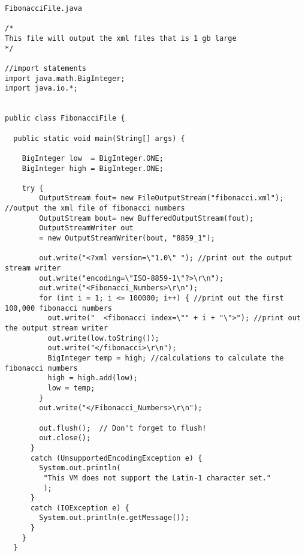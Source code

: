 \documentclass[11pt,english]{article}
\begin{document}
\begin{lstlisting}
FibonacciFile.java

/*
This file will output the xml files that is 1 gb large
*/

//import statements
import java.math.BigInteger;
import java.io.*;


public class FibonacciFile {

  public static void main(String[] args) {
   
    BigInteger low  = BigInteger.ONE;
    BigInteger high = BigInteger.ONE;      
    
    try {        
        OutputStream fout= new FileOutputStream("fibonacci.xml"); //output the xml file of fibonacci numbers
        OutputStream bout= new BufferedOutputStream(fout); 
        OutputStreamWriter out 
        = new OutputStreamWriter(bout, "8859_1");
        
        out.write("<?xml version=\"1.0\" "); //print out the output stream writer
        out.write("encoding=\"ISO-8859-1\"?>\r\n");  
        out.write("<Fibonacci_Numbers>\r\n");  
        for (int i = 1; i <= 100000; i++) { //print out the first 100,000 fibonacci numbers 
          out.write("  <fibonacci index=\"" + i + "\">"); //print out the output stream writer
          out.write(low.toString());
          out.write("</fibonacci>\r\n");
          BigInteger temp = high; //calculations to calculate the fibonacci numbers
          high = high.add(low);
          low = temp;
        }
        out.write("</Fibonacci_Numbers>\r\n"); 
        
        out.flush();  // Don't forget to flush!
        out.close();
      }
      catch (UnsupportedEncodingException e) {
        System.out.println(
         "This VM does not support the Latin-1 character set."
         );
      }
      catch (IOException e) {
        System.out.println(e.getMessage());        
      }
    }
  }
\end{lstlisting}
\newpage
\end{document}
